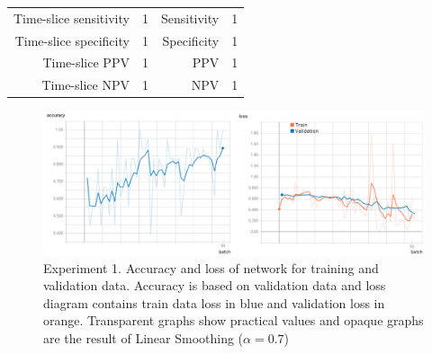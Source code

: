 \documentclass[preprint,12pt]{elsarticle}
\begin{document}
\begin{table}
{\begin{tabular}{ | c | c | c | c | c | c | c | c | }
			\multicolumn{2}{|r|}{Time-slice sensitivity} & 
			\multicolumn{2}{c|}{ 1 } &
			\multicolumn{2}{|r|}{Sensitivity} & 
			\multicolumn{2}{c|}{ 1 } \\ 
			
			\multicolumn{2}{|r|}{Time-slice specificity} & 
			\multicolumn{2}{c|}{ 1 } &
			\multicolumn{2}{|r|}{Specificity} & 
			\multicolumn{2}{c|}{ 1 } \\ 
			
			\multicolumn{2}{|r|}{Time-slice PPV} & 
			\multicolumn{2}{c|}{ 1 } &
			\multicolumn{2}{|r|}{PPV} & 
			\multicolumn{2}{c|}{ 1 } \\ 
			
			\multicolumn{2}{|r|}{Time-slice NPV} & 
			\multicolumn{2}{c|}{ 1 } &
			\multicolumn{2}{|r|}{NPV} & 
			\multicolumn{2}{c|}{ 1 } \\ \hline
		\end{tabular}
	}
	\label{table:tests_1}
\end{table}
\begin{figure}
	\includegraphics[width=\linewidth]{images/tests_1}
	\caption{Experiment 1. Accuracy and loss of network for training and validation data. Accuracy is based on validation data and loss diagram contains train data loss in blue and validation loss in orange. Transparent graphs show practical values and opaque graphs are the result of Linear Smoothing ($\alpha = 0.7$)}
	\label{fig:tests_1}
\end{figure}
\end{document}
